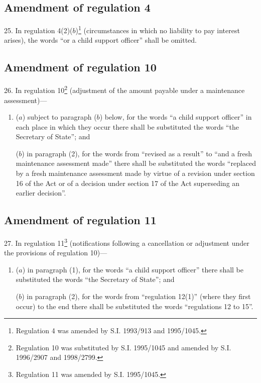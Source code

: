 \documentclass[12pt,a4paper]{article}
\begin{document}
\subsection[25. Amendment of regulation 4]{Amendment of regulation 4}

25.  In regulation 4(2)($b$)\footnote{\frenchspacing Regulation 4 was amended by S.I. 1993/913 and 1995/1045.} (circumstances in which no liability to pay interest arises), the words “or a child support officer” shall be omitted.

\subsection[26. Amendment of regulation 10]{Amendment of regulation 10}

26.  In regulation 10\footnote{\frenchspacing Regulation 10 was substituted by S.I. 1995/1045 and amended by S.I. 1996/2907 and 1998/2799.} (adjustment of the amount payable under a maintenance assessment)—
\begin{enumerate}\item[]
($a$) subject to paragraph ($b$) below, for the words “a child support officer” in each place in which they occur there shall be substituted the words “the Secretary of State”; and

($b$) in paragraph (2), for the words from “revised as a result” to “and a fresh maintenance assessment made” there shall be substituted the words “replaced by a fresh maintenance assessment made by virtue of a revision under section 16 of the Act or of a decision under section 17 of the Act superseding an earlier decision”.
\end{enumerate}

\subsection[27. Amendment of regulation 11]{Amendment of regulation 11}

27.  In regulation 11\footnote{\frenchspacing Regulation 11 was amended by S.I. 1995/1045.} (notifications following a cancellation or adjustment under the provisions of regulation 10)—
\begin{enumerate}\item[]
($a$) in paragraph (1), for the words “a child support officer” there shall be substituted the words “the Secretary of State”; and

($b$) in paragraph (2), for the words from “regulation 12(1)” (where they first occur) to the end there shall be substituted the words “regulations 12 to 15”.
\end{enumerate}
\end{document}
